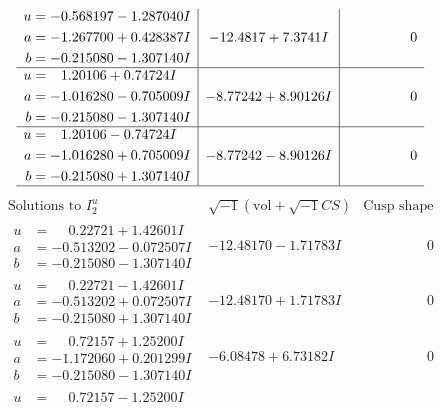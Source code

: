 \documentclass[1p]{elsarticle_modified}
\theoremstyle{definition}
\newcommand{\I}{\sqrt{-1}}
\begin{document}
$$\begin{array}{c|c|c}
\begin{aligned}
u &= -0.568197 - 1.287040 I \\
a &= -1.267700 + 0.428387 I \\
b &= -0.215080 - 1.307140 I\end{aligned}
 & -12.4817 + 7.3741 I & \phantom{-0.000000 } 0 \\ \hline\begin{aligned}
u &= \phantom{-}1.20106 + 0.74724 I \\
a &= -1.016280 - 0.705009 I \\
b &= -0.215080 - 1.307140 I\end{aligned}
 & -8.77242 + 8.90126 I & \phantom{-0.000000 } 0 \\ \hline\begin{aligned}
u &= \phantom{-}1.20106 - 0.74724 I \\
a &= -1.016280 + 0.705009 I \\
b &= -0.215080 + 1.307140 I\end{aligned}
 & -8.77242 - 8.90126 I & \phantom{-0.000000 } 0\\
 \hline 
 \end{array}$$\newpage$$\begin{array}{c|c|c}  
\text{Solutions to }I^u_{2}& \I (\text{vol} + \sqrt{-1}CS) & \text{Cusp shape}\\
 \hline 
\begin{aligned}
u &= \phantom{-}0.22721 + 1.42601 I \\
a &= -0.513202 - 0.072507 I \\
b &= -0.215080 - 1.307140 I\end{aligned}
 & -12.48170 - 1.71783 I & \phantom{-0.000000 } 0 \\ \hline\begin{aligned}
u &= \phantom{-}0.22721 - 1.42601 I \\
a &= -0.513202 + 0.072507 I \\
b &= -0.215080 + 1.307140 I\end{aligned}
 & -12.48170 + 1.71783 I & \phantom{-0.000000 } 0 \\ \hline\begin{aligned}
u &= \phantom{-}0.72157 + 1.25200 I \\
a &= -1.172060 + 0.201299 I \\
b &= -0.215080 - 1.307140 I\end{aligned}
 & -6.08478 + 6.73182 I & \phantom{-0.000000 } 0 \\ \hline\begin{aligned}
u &= \phantom{-}0.72157 - 1.25200 I \\

\end{aligned}
\end{array}$$
\end{document}
